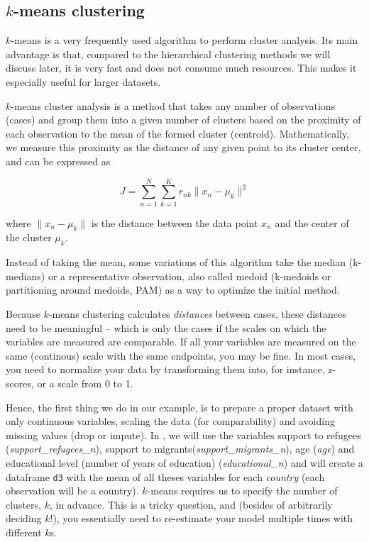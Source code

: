 \subsection{$k$-means clustering}

$k$-means is a very frequently used algorithm to perform cluster
analysis. Its main advantage is that, compared to the hierarchical
clustering methods we will discuss later, it is very fast and does not
consume much resources. This makes it especially useful for larger
datasets.

$k$-means cluster analysis is a method that takes any number of observations (cases) and group them into a given number of clusters based on the proximity of each observation to the mean of the formed cluster (centroid).  Mathematically, we measure this proximity as the distance of any given point to its cluster center, and can be expressed as

$$J = \sum_{n=1}^{N} \sum_{k=1}^{K} r_{nk} \|x_n - \mu_k\|^2$$

where $\|x_n - \mu_k\|$ is the distance between the data point $x_n$ and the center of the cluster $\mu_k$.

Instead of taking the mean, some variations of this algorithm take the median (k-medians) or a representative observation, also called medoid (k-medoids or partitioning around medoids, PAM) as a way to optimize the initial method.

Because $k$-means clustering calculates \emph{distances} between cases,
these distances need to be meaningful -- which is only the cases if
the scales on which the variables are measured are comparable. If all
your variables are measured on the same (continous) scale with the
same endpoints, you may be fine. In most cases, you need to normalize
your data by transforming them into, for instance, z-scores, or a
scale from 0 to 1.

Hence, the first thing we do in our example, is to prepare a proper
dataset with only continuous variables, scaling the data (for
comparability) and avoiding missing values (drop or impute). In
, we will use the variables support to refugees
(\emph{support\_refugees\_n}), support to
migrants(\emph{support\_migrants\_n}), age (\emph{age}) and
educational level (number of years of education)
(\emph{educational\_n}) and will create a dataframe \verb+d3+ with the
mean of all theses variables for each \emph{country} (each observation
will be a country). $k$-means requires us to specify the number of
clusters, $k$, in advance. This is a tricky question, and (besides of
arbitrarily deciding $k$!), you essentially need to re-estimate your
model multiple times with different $k$s.

